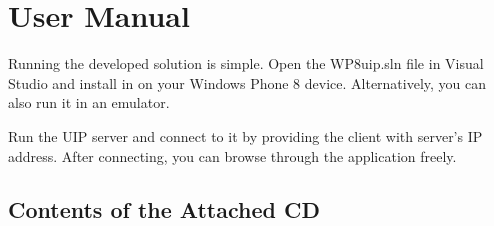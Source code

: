 \chapter{User Manual}
Running the developed solution is simple. Open the WP8uip.sln file in Visual Studio and install in on your Windows Phone 8 device. Alternatively, you can also run it in  an emulator.

Run the UIP server and connect to it by providing the client with server's IP address. After connecting, you can browse through the application freely.


\section{Contents of the Attached CD}
    

